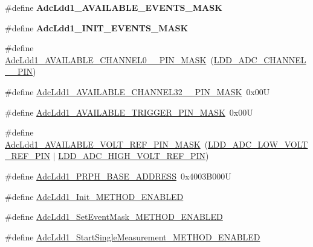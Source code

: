 \begin{DoxyCompactItemize}
\item 
\#define {\bfseries Adc\+Ldd1\+\_\+\+A\+V\+A\+I\+L\+A\+B\+L\+E\+\_\+\+E\+V\+E\+N\+T\+S\+\_\+\+M\+A\+SK}
\item 
\#define {\bfseries Adc\+Ldd1\+\_\+\+I\+N\+I\+T\+\_\+\+E\+V\+E\+N\+T\+S\+\_\+\+M\+A\+SK}
\item 
\#define \hyperlink{group___adc_ldd1__module_gae667536b042ed10bbf59a6ab655e2520}{Adc\+Ldd1\+\_\+\+A\+V\+A\+I\+L\+A\+B\+L\+E\+\_\+\+C\+H\+A\+N\+N\+E\+L0\+\_\+\_\+\+P\+I\+N\+\_\+\+M\+A\+SK}~(\hyperlink{group___p_e___types__module_ga68b9b7285d322b045dc99ae29c120b7d}{L\+D\+D\+\_\+\+A\+D\+C\+\_\+\+C\+H\+A\+N\+N\+E\+L\+\_\+\_\+\+P\+IN})
\item 
\#define \hyperlink{group___adc_ldd1__module_ga76e2c2c848190a43f723097450d2bd44}{Adc\+Ldd1\+\_\+\+A\+V\+A\+I\+L\+A\+B\+L\+E\+\_\+\+C\+H\+A\+N\+N\+E\+L32\+\_\+\_\+\+P\+I\+N\+\_\+\+M\+A\+SK}~0x00U
\item 
\#define \hyperlink{group___adc_ldd1__module_ga9364f8d60a68e5f5546eb5bf87436569}{Adc\+Ldd1\+\_\+\+A\+V\+A\+I\+L\+A\+B\+L\+E\+\_\+\+T\+R\+I\+G\+G\+E\+R\+\_\+\+P\+I\+N\+\_\+\+M\+A\+SK}~0x00U
\item 
\#define \hyperlink{group___adc_ldd1__module_ga42c6c07d48741426405776dfc62732a6}{Adc\+Ldd1\+\_\+\+A\+V\+A\+I\+L\+A\+B\+L\+E\+\_\+\+V\+O\+L\+T\+\_\+\+R\+E\+F\+\_\+\+P\+I\+N\+\_\+\+M\+A\+SK}~(\hyperlink{group___p_e___types__module_ga2aca9e4004ca4eb785f08bd3c07c7f8a}{L\+D\+D\+\_\+\+A\+D\+C\+\_\+\+L\+O\+W\+\_\+\+V\+O\+L\+T\+\_\+\+R\+E\+F\+\_\+\+P\+IN} $\vert$ \hyperlink{group___p_e___types__module_ga1c613e5f56972bb45b94fa9d272f9589}{L\+D\+D\+\_\+\+A\+D\+C\+\_\+\+H\+I\+G\+H\+\_\+\+V\+O\+L\+T\+\_\+\+R\+E\+F\+\_\+\+P\+IN})
\item 
\#define \hyperlink{group___adc_ldd1__module_ga7d69dbadf1bf96582b0bc8677162cadf}{Adc\+Ldd1\+\_\+\+P\+R\+P\+H\+\_\+\+B\+A\+S\+E\+\_\+\+A\+D\+D\+R\+E\+SS}~0x4003\+B000U
\item 
\#define \hyperlink{group___adc_ldd1__module_ga49d23fa753cfb435ad0ecc28c582987e}{Adc\+Ldd1\+\_\+\+Init\+\_\+\+M\+E\+T\+H\+O\+D\+\_\+\+E\+N\+A\+B\+L\+ED}
\item 
\#define \hyperlink{group___adc_ldd1__module_gafca235ff2ec44187cfa5ef7e7a0ca88f}{Adc\+Ldd1\+\_\+\+Set\+Event\+Mask\+\_\+\+M\+E\+T\+H\+O\+D\+\_\+\+E\+N\+A\+B\+L\+ED}
\item 
\#define \hyperlink{group___adc_ldd1__module_gaf2efa18f3ace8958bffdf8bcfbea8034}{Adc\+Ldd1\+\_\+\+Start\+Single\+Measurement\+\_\+\+M\+E\+T\+H\+O\+D\+\_\+\+E\+N\+A\+B\+L\+ED}

\end{DoxyCompactItemize}
